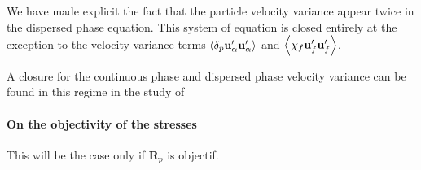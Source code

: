 We have made explicit the fact that the particle velocity variance appear twice in the dispersed phase equation. 
This system of equation is closed entirely at the exception to the velocity variance terms $\left<\delta_{p} \textbf{u}_\alpha'\textbf{u}_\alpha'\right>$ and $\left<\chi_f \textbf{u}_f'\textbf{u}_f'\right>$. 

A closure for the continuous phase and dispersed phase velocity variance can be found in this regime in the study of \citet{koch1993hydrodynamic} 

\paragraph{On the objectivity of the stresses}
This will be the case only if $\textbf{R}_p$ is objectif. 